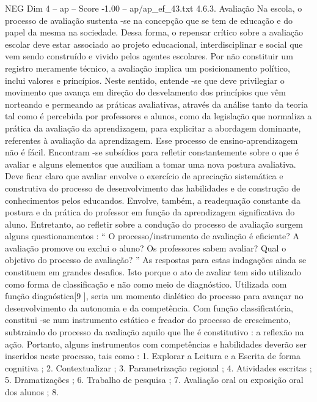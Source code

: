 \begin{textsample}{NEG Dim 4 – ap – Score -1.00 – ap/ap\_ef\_43.txt}  \label{ex:f4_neg_059}
4.6.3.
Avaliação Na escola, o processo de avaliação sustenta -se na concepção que se tem de educação e do papel da mesma na sociedade.
Dessa forma, o repensar crítico sobre a avaliação escolar deve estar associado ao projeto educacional, interdisciplinar e social que vem sendo construído e vivido pelos agentes escolares.
Por não constituir um registro meramente técnico, a avaliação implica um posicionamento político, inclui valores e princípios.
Neste sentido, entende -se que deve privilegiar o movimento que avança em direção do desvelamento dos princípios que vêm norteando e permeando as práticas avaliativas, através da análise tanto da teoria tal como é percebida por professores e alunos, como da legislação que normaliza a prática da avaliação da aprendizagem, para explicitar a abordagem dominante, referentes à avaliação da aprendizagem.
Esse processo de ensino-aprendizagem não é fácil.
Encontram -se subsídios para refletir constantemente sobre o que é avaliar e alguns elementos que auxiliam a tomar uma nova postura avaliativa.
Deve ficar claro que avaliar envolve o exercício de apreciação sistemática e construtiva do processo de desenvolvimento das habilidades e de construção de conhecimentos pelos educandos.
Envolve, também, a readequação constante da postura e da prática do professor em função da aprendizagem significativa do aluno.
Entretanto, ao refletir sobre a condução do processo de avaliação surgem alguns questionamentos : “ O processo/instrumento de avaliação é eficiente?
A avaliação promove ou exclui o aluno?
Os professores sabem avaliar?
Qual o objetivo do processo de avaliação? ” As respostas para estas indagações ainda se constituem em grandes desafios.
Isto porque o ato de avaliar tem sido utilizado como forma de classificação e não como meio de diagnóstico.
Utilizada com função diagnóstica[9 ], seria um momento dialético do processo para avançar no desenvolvimento da autonomia e da competência.
Com função classificatória, constitui -se num instrumento estático e freador do processo de crescimento, subtraindo do processo da avaliação aquilo que lhe é constitutivo : a reflexão na ação.
Portanto, alguns instrumentos com competências e habilidades deverão ser inseridos neste processo, tais como : 1.
Explorar a Leitura e a Escrita de forma cognitiva ; 2.
Contextualizar ; 3.
Parametrização regional ; 4.
Atividades escritas ; 5.
Dramatizações ; 6.
Trabalho de pesquisa ; 7.
Avaliação oral ou exposição oral dos alunos ; 8.

\end{textsample}
